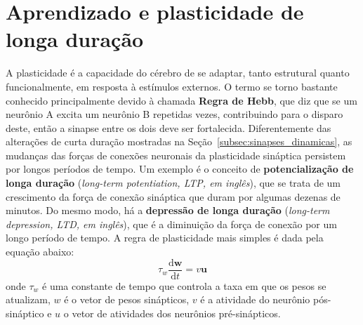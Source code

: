 \section{Aprendizado e plasticidade de longa duração}\label{sec:aprendizado}

A plasticidade é a capacidade do cérebro de se adaptar, tanto estrutural quanto funcionalmente, em resposta à estímulos externos.
O termo se torno bastante conhecido principalmente devido à chamada \textbf{Regra de Hebb}, que diz que se um neurônio A excita um neurônio B repetidas vezes, contribuindo para o disparo deste, então a sinapse entre os dois deve ser fortalecida.
Diferentemente das alterações de curta duração mostradas na Seção~\ref{subsec:sinapses_dinamicas}, as mudanças das forças de conexões neuronais da plasticidade sináptica persistem por longos períodos de tempo. Um exemplo é o conceito de \textbf{potencialização de longa duração} (\textit{long-term potentiation, LTP, em inglês}), que se trata de um crescimento da força de conexão sináptica que duram por algumas dezenas de minutos.
Do mesmo modo, há a \textbf{depressão de longa duração} (\textit{long-term depression, LTD, em inglês}), que é a diminuição da força de conexão por um longo período de tempo.
A regra de plasticidade mais simples é dada pela equação abaixo:
\begin{equation}\label{eq:regra_hebb}
	\tau_w\dfrac{\mathrm{d}\mathbf{w}}{\mathrm{d}t}=v\mathbf{u}
\end{equation}
onde $\tau_w$ é uma constante de tempo que controla a taxa em que os pesos se atualizam, $w$ é o vetor de pesos sinápticos, $v$ é a atividade do neurônio pós-sináptico e $u$ o vetor de atividades dos neurônios pré-sinápticos.

